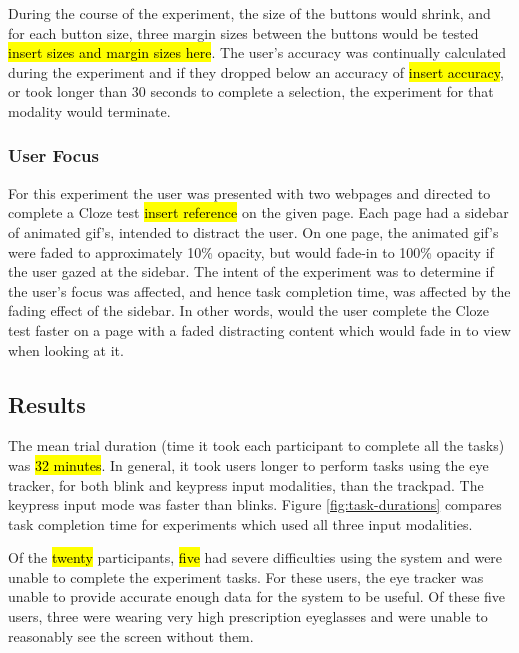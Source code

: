 \documentclass{sigchi}
\begin{document}
During the course of the experiment, the size of the buttons would 
shrink, and for each button size, three margin sizes between the buttons
would be tested \hl{insert sizes and margin sizes here}. The user's 
accuracy was continually calculated during the experiment and if they 
dropped below an accuracy of \hl{insert accuracy}, or took longer than
30 seconds to complete a selection, the experiment for that modality 
would terminate.

\subsubsection{User Focus}
For this experiment the user was presented with two webpages and 
directed to complete a Cloze test \hl{insert reference} on the given
page. Each page had a sidebar of animated gif's, intended to distract
the user. On one page, the animated gif's were faded to approximately
10\% opacity, but would fade-in to 100\% opacity if the user gazed at
the sidebar. The intent of the experiment was to determine if the user's
focus was affected, and hence task completion time, was affected by
the fading effect of the sidebar. In other words, would the user complete
the Cloze test faster on a page with a faded distracting content which
would fade in to view when looking at it.


\subsection{Results}
The mean trial duration (time it took each participant to complete 
all the tasks) was \hl{32 minutes}. In general, it took users longer 
to perform tasks using the eye tracker, for both blink and keypress input
modalities, than the trackpad. The keypress input mode was faster
than blinks. Figure \ref{fig:task-durations} compares task completion 
time for experiments which used all three input modalities.

Of the \hl{twenty} participants, \hl{five} had severe difficulties
using the system and were unable to complete the experiment tasks.
For these users, the eye tracker was unable to provide accurate enough data
for the system to be useful. Of these five users, three were wearing
very high prescription eyeglasses and were unable to reasonably see the
screen without them.
\end{document}
